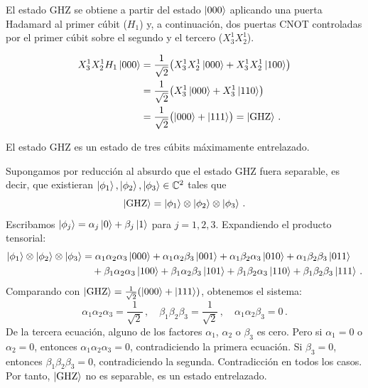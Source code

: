 \documentclass[]{unirTema}
\begin{document}
\begin{eje}
  El estado GHZ se obtiene a partir del estado $\ket{000}$ aplicando una puerta Hadamard al primer cúbit ($H_1$) y, a continuación, dos puertas CNOT controladas por el primer cúbit sobre el segundo y el tercero ($X^1_3 X^1_2$).

  \begin{align*}
    X^1_3 X^1_2 H_1\ket{000} & = \frac{1}{\sqrt{2}}\bigl(X^1_3 X^1_2\ket{000}+X^1_3 X^1_2\ket{100}\bigr) \\
                             & = \frac{1}{\sqrt{2}}\bigl(X^1_3\ket{000}+X^1_3\ket{110}\bigr)             \\
                             & = \frac{1}{\sqrt{2}}\bigl(\ket{000}+\ket{111}\bigr) = \ket{\text{GHZ}}\,.
  \end{align*}
\end{eje}

El estado GHZ es un estado de tres cúbits máximamente entrelazado.

\begin{eje}
  Supongamos por reducción al absurdo que el estado GHZ fuera separable, es decir, que existieran $\ket{\phi_1},\ket{\phi_2},\ket{\phi_3}\in\mathbb{C}^2$ tales que
  \[
    \ket{\text{GHZ}} = \ket{\phi_1}\otimes\ket{\phi_2}\otimes\ket{\phi_3}\,.
  \]
  Escribamos $\ket{\phi_j} = \alpha_j\ket{0}+\beta_j\ket{1}$ para $j=1,2,3$. Expandiendo el producto tensorial:
  \begin{align*}
    \ket{\phi_1}\otimes\ket{\phi_2}\otimes\ket{\phi_3}
     & = \alpha_1\alpha_2\alpha_3\ket{000}
    + \alpha_1\alpha_2\beta_3\ket{001}
    + \alpha_1\beta_2\alpha_3\ket{010}
    + \alpha_1\beta_2\beta_3\ket{011}           \\
     & \quad + \beta_1\alpha_2\alpha_3\ket{100}
    + \beta_1\alpha_2\beta_3\ket{101}
    + \beta_1\beta_2\alpha_3\ket{110}
    + \beta_1\beta_2\beta_3\ket{111}\,.
  \end{align*}
  Comparando con $\ket{\text{GHZ}} = \frac{1}{\sqrt{2}}(\ket{000}+\ket{111})$, obtenemos el sistema:
  \[
    \alpha_1\alpha_2\alpha_3 = \frac{1}{\sqrt{2}}\,,\quad
    \beta_1\beta_2\beta_3 = \frac{1}{\sqrt{2}}\,,\quad
    \alpha_1\alpha_2\beta_3 = 0\,.
  \]
  De la tercera ecuación, alguno de los factores $\alpha_1$, $\alpha_2$ o $\beta_3$ es cero. Pero si $\alpha_1=0$ o $\alpha_2=0$, entonces $\alpha_1\alpha_2\alpha_3=0$, contradiciendo la primera ecuación. Si $\beta_3=0$, entonces $\beta_1\beta_2\beta_3=0$, contradiciendo la segunda. Contradicción en todos los casos. Por tanto, $\ket{\text{GHZ}}$ no es separable, es un estado entrelazado.
\end{eje}
\end{document}
